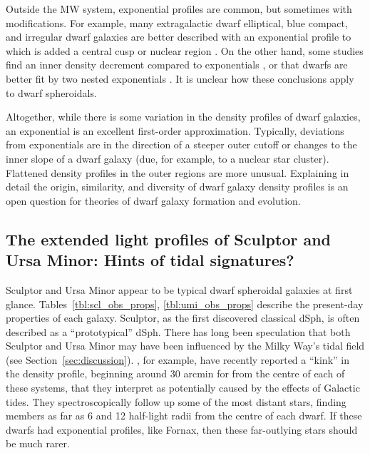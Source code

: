 Outside the MW system, exponential profiles are common, but sometimes
with modifications. For example, many extragalactic dwarf elliptical,
blue compact, and irregular dwarf galaxies are better described with an
exponential profile to which is added a central cusp or nuclear region
\citep{caldwell+bothun1987, noeske+2003}. On the other hand, some
studies find an inner density decrement compared to exponentials
\citep[e.g.,][]{caldwell+1992, makarov+2012}, or that dwarfs are better
fit by two nested exponentials
\citep[e.g.,][]{aparicio+1997, graham+guzman2003, hunter+elmegreen2006, lee+2018}.
It is unclear how these conclusions apply to dwarf spheroidals.

Altogether, while there is some variation in the density profiles of
dwarf galaxies, an exponential is an excellent first-order
approximation. Typically, deviations from exponentials are in the
direction of a steeper outer cutoff or changes to the inner slope of a
dwarf galaxy (due, for example, to a nuclear star cluster). Flattened
density profiles in the outer regions are more unusual. Explaining in
detail the origin, similarity, and diversity of dwarf galaxy density
profiles is an open question for theories of dwarf galaxy formation and
evolution.

\subsection{The extended light profiles of Sculptor and Ursa Minor:
Hints of tidal
signatures?}\label{the-extended-light-profiles-of-sculptor-and-ursa-minor-hints-of-tidal-signatures}

Sculptor and Ursa Minor appear to be typical dwarf spheroidal galaxies
at first glance. Tables~\ref{tbl:scl_obs_props}, \ref{tbl:umi_obs_props}
describe the present-day properties of each galaxy. Sculptor, as the
first discovered classical dSph, is often described as a
``prototypical'' dSph. There has long been speculation that both
Sculptor and Ursa Minor may have been influenced by the Milky Way's
tidal field (see Section~\ref{sec:discussion}).
\citet{sestito+2023a, sestito+2023b}, for example, have recently
reported a ``kink'' in the density profile, beginning around 30 arcmin
for from the centre of each of these systems, that they interpret as
potentially caused by the effects of Galactic tides. They
spectroscopically follow up some of the most distant stars, finding
members as far as 6 and 12 half-light radii from the centre of each
dwarf. If these dwarfs had exponential profiles, like Fornax, then these
far-outlying stars should be much rarer.

